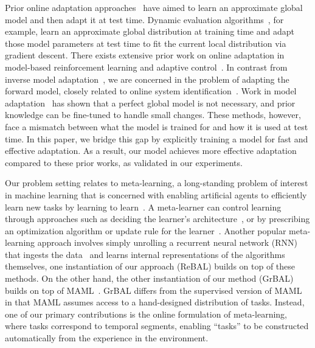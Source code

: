 Prior online adaptation approaches~\citep{tanaskovic2013adaptive,aswani2012extensions} have aimed to learn an approximate global model and then adapt it at test time. Dynamic evaluation algorithms~\citep{rei2015onlinerepre,krause2017dynamiceval,krause2016multiplicative,fortunato2017bayesian}, for example, learn an approximate global distribution at training time and adapt those model parameters at test time to fit the current local distribution via gradient descent. There exists extensive prior work on online adaptation in model-based reinforcement learning and adaptive control~\citep{sastry1989adaptive}. In contrast from inverse model adaptation~\citep{kelouwani2012online,underwood2010online, pastor2011online, franzi2016robustonline, franzi2016drift, rai2017feedback}, we are concerned in the problem of adapting the forward model, closely related to online system identification~\citep{manganiello2014optimization}. Work in model adaptation~\citep{levine2013guided,gu2016continuous,fu2015onlineadapt, weinstein2017motorcontrol} has shown that a perfect global model is not necessary, and prior knowledge can be fine-tuned to handle small changes. These methods, however, face a mismatch between what the model is trained for and how it is used at test time. In this paper, we bridge this gap by explicitly training a model for fast and effective adaptation. As a result, our model achieves more effective adaptation compared to these prior works, as validated in our experiments.

Our problem setting relates to meta-learning, a long-standing problem of interest in machine learning that is concerned with enabling artificial agents to efficiently learn new tasks by learning to learn~\citep{thrun1998learning,schmidhuber1991learning,naik1992meta,lake2015human}. A meta-learner can control learning through approaches such as deciding the learner's architecture~\citep{baker2016designing}, or by prescribing an optimization algorithm or update rule for the learner~\citep{bengio1990learning,schmidhuber1992learning,younger2001meta,andrychowicz2016learntolearn,li2016learning,ravi2016optimization}.
Another popular meta-learning approach involves simply unrolling a recurrent neural network (RNN) that ingests the data~\citep{santoro2016one,munkhdalai2017meta,munkhdalai2017learning,mishra2017simple} and learns internal representations of the algorithms themselves, one instantiation of our approach (ReBAL) builds on top of these methods.
On the other hand, the other instantiation of our method (GrBAL) builds on top of MAML~\citep{finn2017maml}. GrBAL differs from the supervised version of MAML in that MAML assumes access to a hand-designed distribution of tasks. Instead, one of our primary contributions is the online formulation of meta-learning, where tasks correspond to temporal segments, enabling ``tasks'' to be constructed automatically from the experience in the environment.

